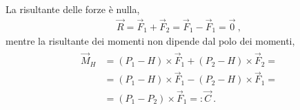 \documentclass[letterpaper,10pt,italian]{jupyterBook}
\begin{document}
\sphinxAtStartPar
{} 

\sphinxAtStartPar
La risultante delle forze è nulla,
\begin{equation*}
\begin{split}\vec{R} = \vec{F}_1 + \vec{F}_2 = \vec{F}_1 - \vec{F}_1 = \vec{0} \ ,\end{split}
\end{equation*}
\sphinxAtStartPar
mentre la risultante dei momenti non dipende dal polo dei momenti,
\begin{equation*}
\begin{split}\begin{aligned}
  \vec{M}_H & = (P_1 - H) \times \vec{F}_1 + (P_2 - H) \times \vec{F}_2 = \\
  & = (P_1 - H) \times \vec{F}_1 - (P_2 - H) \times \vec{F}_1 = \\
  & = (P_1 - P_2) \times \vec{F}_1 =: \vec{C} \ .
\end{aligned}\end{split}
\end{equation*}
\end{document}
